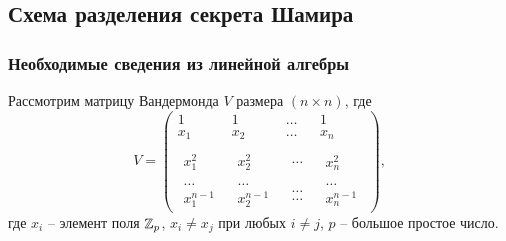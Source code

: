 \subsection[Схема Шамира]{Схема разделения секрета Шамира}


\subsubsection{Необходимые сведения из линейной алгебры}

Рассмотрим матрицу Вандермонда $V$ размера $(n \times n)$, где
\[
    V = \left(\begin{array}{cccc}
        {1} & {1} & { \ldots } & {1} \\
        {x_{1} } & {x_{2} } & { \ldots } & {x_{n} } \\
        {\begin{array}{l} {} \\ {x_{1}^{2} } \end{array}} &
            {\begin{array}{l} {} \\ {x_{2}^{2} } \end{array}} &
            {\begin{array}{l} {} \\ { \ldots } \end{array}} &
            {\begin{array}{l} {} \\ {x_{n}^{2} } \end{array}} \\
        {\begin{array}{l} { \ldots } \\ {x_{1}^{n-1} } \end{array}} &
            {\begin{array}{l} { \ldots } \\ {x_{2}^{n-1} } \end{array}} &
            {\begin{array}{l} { \ldots } \\ { \ldots } \end{array}} &
            {\begin{array}{l} { \ldots } \\ {x_{n}^{n-1} } \end{array}}
    \end{array}\right),
\]
где $x_{i}$ -- элемент поля $\mathbb{Z}_{p}$, $x_{i} \ne x_{j}$ при любых $i \ne j$, $p$ -- большое простое число.

